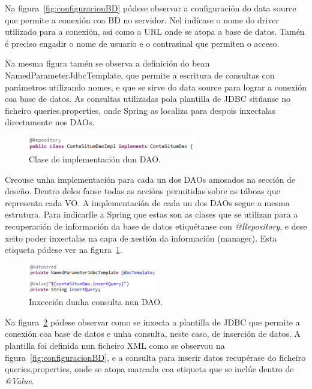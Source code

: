 Na figura~\ref{fig:configuracionBD} pódese observar a configuración do data source que permite a conexión coa BD no servidor. Nel indícase o nome do driver utilizado para a conexión, así como a URL onde se atopa a base de datos. Tamén é preciso engadir o nome de usuario e o contrasinal que permiten o acceso.

Na mesma figura tamén se observa a definición do bean NamedParameterJdbcTemplate, que permite a escritura de consultas con parámetros utilizando nomes, e que se sirve do data source para lograr a conexión coa base de datos. As consultas utilizadas pola plantilla de JDBC sitúanse no ficheiro queries.properties, onde Spring as localiza para despois inxectalas directamente nos DAOs.

\begin{figure}[tbh] 
	\begin{center}
		\includegraphics[width=0.65\textwidth]{figures/codigo/dao}
		\caption{Clase de implementación dun DAO.}
		\label{fig:dao}
	\end{center}
\end{figure}

Creouse unha implementación para cada un dos DAOs amosados na sección de deseño. Dentro deles fanse todas as accións permitidas sobre as táboas que representa cada VO. A implementación de cada un dos DAOs segue a mesma estrutura. Para indicarlle a Spring que estas son as clases que se utilizan para a recuperación de información da base de datos etiquétanse con \emph{@Repository}, e dese xeito poder inxectalas na capa de xestión da información (manager). Esta etiqueta pódese ver na figura~\ref{fig:dao}.

\begin{figure}[tbh] 
	\begin{center}
		\includegraphics[width=0.5\textwidth]{figures/codigo/inxeccionDao}
		\caption{Inxección dunha consulta nun DAO.}
		\label{fig:inxeccionDao}
	\end{center}
\end{figure}

Na figura~\ref{fig:inxeccionDao} pódese observar como se inxecta a plantilla de JDBC que permite a conexión coa base de datos e unha consulta, neste caso, de inserción de datos. A plantilla foi definida nun ficheiro XML como se observou na figura~\ref{fig:configuracionBD}, e a consulta para inserir datos recupérase do ficheiro queries.properties, onde se atopa marcada coa etiqueta que se inclúe dentro de \emph{@Value}.

